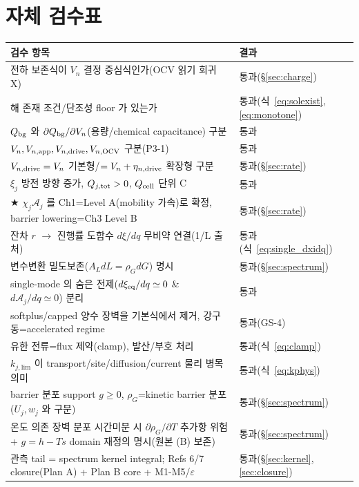 \section{자체 검수표}\label{sec:selfcheck}
\begin{longtable}{p{} p{}}
\toprule 검수 항목 & 결과 \\ \midrule \endhead
전하 보존식이 $V_n$ 결정 중심식인가(OCV 읽기 회귀 X) & 통과(\S\ref{sec:charge}) \\
해 존재 조건/단조성 floor 가 있는가 & 통과(식~\eqref{eq:solexist},\eqref{eq:monotone}) \\
$Q_{\mathrm{bg}}$ 와 $\partial Q_{\mathrm{bg}}/\partial V_n$(용량/chemical capacitance) 구분 & 통과 \\
$V_n,V_{n,\mathrm{app}},V_{n,\mathrm{drive}},V_{n,\mathrm{OCV}}$ 구분(P3-1) & 통과 \\
$V_{n,\mathrm{drive}}=V_n$ 기본형/$=V_n+\eta_{n,\mathrm{drive}}$ 확장형 구분 & 통과(\S\ref{sec:rate}) \\
$\xi_j$ 방전 방향 증가, $Q_{j,\mathrm{tot}}>0$, $Q_{\mathrm{cell}}$ 단위 C & 통과 \\
★ $\chi_j\mathcal A_j$ 를 Ch1=Level A(mobility 가속)로 확정, barrier lowering=Ch3 Level B & 통과(\S\ref{sec:rate}) \\
잔차 $r$ $\to$ 진행률 도함수 $d\xi/dq$ 무비약 연결(1/L 출처) & 통과(식~\eqref{eq:single_dxidq}) \\
변수변환 밀도보존($A_L dL=\rho_G dG$) 명시 & 통과(\S\ref{sec:spectrum}) \\
single-mode 의 숨은 전제($d\xi_{\mathrm{eq}}/dq\simeq0$ \& $d\mathcal A_j/dq\simeq0$) 분리 & 통과 \\
softplus/capped 양수 장벽을 기본식에서 제거, 강구동=accelerated regime & 통과(GS-4) \\
유한 전류=flux 제약(clamp), 발산/부호 처리 & 통과(식~\eqref{eq:clamp}) \\
$k_{j,\mathrm{lim}}$ 이 transport/site/diffusion/current 물리 병목 의미 & 통과(식~\eqref{eq:kphys}) \\
barrier 분포 support $g\ge0$, $\rho_G$=kinetic barrier 분포($U_j,w_j$ 와 구분) & 통과(\S\ref{sec:spectrum}) \\
온도 의존 장벽 분포 시간미분 시 $\partial\rho_G/\partial T$ 추가항 위험 + $g=h-Ts$ domain 재정의 명시(원본 (B) 보존) & 통과(\S\ref{sec:spectrum}) \\
관측 tail = spectrum kernel integral; Refs 6/7 closure(Plan A) + Plan B core + M1-M5/$\varepsilon$ & 통과(\S\ref{sec:kernel},\ref{sec:closure}) \\

\end{longtable}
